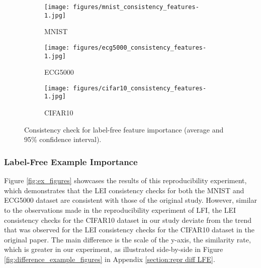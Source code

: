 \begin{figure}[h]
\centering
\begin{subfigure}{0.32\textwidth}
    \texttt{[image: figures/mnist\_consistency\_features-1.jpg]}
    \caption{MNIST}
    \label{fig:MNIST_feature_consistency}
\end{subfigure}
\hfill
\begin{subfigure}{0.32\textwidth}
    \texttt{[image: figures/ecg5000\_consistency\_features-1.jpg]}
    \caption{ECG5000}
    \label{fig:ECG5000_feature_consistency}
\end{subfigure}
\hfill
\begin{subfigure}{0.32\textwidth}
    \texttt{[image: figures/cifar10\_consistency\_features-1.jpg]}
    \caption{CIFAR10}
    \label{fig:cifar_feature_consistency}
\end{subfigure}
        
\caption{Consistency check for label-free feature importance (average and 95\% confidence interval).}
\label{fig:feature_figures}
\end{figure}

\subsubsection{Label-Free Example Importance} 
Figure \ref{fig:ex_figures} showcases the results of this reproducibility experiment, which demonstrates that the LEI consistency checks for both the MNIST and ECG5000 dataset are consistent with those of the original study. However, similar to the observations made in the reproducibility experiment of LFI, the LEI consistency checks for the CIFAR10 dataset in our study deviate from the trend that was observed for the LEI consistency checks for the CIFAR10 dataset in the original paper. The main difference is the scale of the y-axis, the similarity rate, which is greater in our experiment, as illustrated side-by-side in Figure \ref{fig:difference_example_figures} in Appendix \ref{section:repr diff LFE}.

